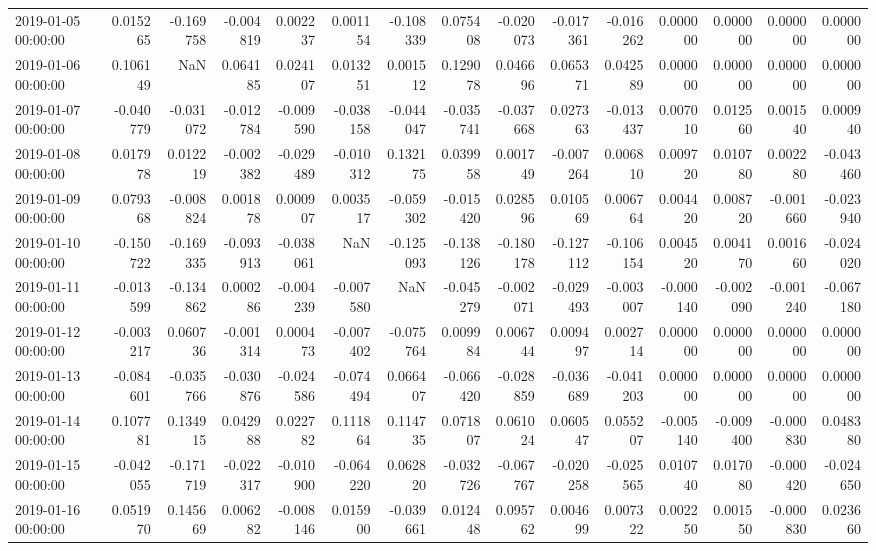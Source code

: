 \begin{tabular}{lrrrrrrrrrrrrrr}
2019-01-05 00:00:00 & 0.015265 & -0.169758 & -0.004819 & 0.002237 & 0.001154 & -0.108339 & 0.075408 & -0.020073 & -0.017361 & -0.016262 & 0.000000 & 0.000000 & 0.000000 & 0.000000 \\
2019-01-06 00:00:00 & 0.106149 & NaN & 0.064185 & 0.024107 & 0.013251 & 0.001512 & 0.129078 & 0.046696 & 0.065371 & 0.042589 & 0.000000 & 0.000000 & 0.000000 & 0.000000 \\
2019-01-07 00:00:00 & -0.040779 & -0.031072 & -0.012784 & -0.009590 & -0.038158 & -0.044047 & -0.035741 & -0.037668 & 0.027363 & -0.013437 & 0.007010 & 0.012560 & 0.001540 & 0.000940 \\
2019-01-08 00:00:00 & 0.017978 & 0.012219 & -0.002382 & -0.029489 & -0.010312 & 0.132175 & 0.039958 & 0.001749 & -0.007264 & 0.006810 & 0.009720 & 0.010780 & 0.002280 & -0.043460 \\
2019-01-09 00:00:00 & 0.079368 & -0.008824 & 0.001878 & 0.000907 & 0.003517 & -0.059302 & -0.015420 & 0.028596 & 0.010569 & 0.006764 & 0.004420 & 0.008720 & -0.001660 & -0.023940 \\
2019-01-10 00:00:00 & -0.150722 & -0.169335 & -0.093913 & -0.038061 & NaN & -0.125093 & -0.138126 & -0.180178 & -0.127112 & -0.106154 & 0.004520 & 0.004170 & 0.001660 & -0.024020 \\
2019-01-11 00:00:00 & -0.013599 & -0.134862 & 0.000286 & -0.004239 & -0.007580 & NaN & -0.045279 & -0.002071 & -0.029493 & -0.003007 & -0.000140 & -0.002090 & -0.001240 & -0.067180 \\
2019-01-12 00:00:00 & -0.003217 & 0.060736 & -0.001314 & 0.000473 & -0.007402 & -0.075764 & 0.009984 & 0.006744 & 0.009497 & 0.002714 & 0.000000 & 0.000000 & 0.000000 & 0.000000 \\
2019-01-13 00:00:00 & -0.084601 & -0.035766 & -0.030876 & -0.024586 & -0.074494 & 0.066407 & -0.066420 & -0.028859 & -0.036689 & -0.041203 & 0.000000 & 0.000000 & 0.000000 & 0.000000 \\
2019-01-14 00:00:00 & 0.107781 & 0.134915 & 0.042988 & 0.022782 & 0.111864 & 0.114735 & 0.071807 & 0.061024 & 0.060547 & 0.055207 & -0.005140 & -0.009400 & -0.000830 & 0.048380 \\
2019-01-15 00:00:00 & -0.042055 & -0.171719 & -0.022317 & -0.010900 & -0.064220 & 0.062820 & -0.032726 & -0.067767 & -0.020258 & -0.025565 & 0.010740 & 0.017080 & -0.000420 & -0.024650 \\
2019-01-16 00:00:00 & 0.051970 & 0.145669 & 0.006282 & -0.008146 & 0.015900 & -0.039661 & 0.012448 & 0.095762 & 0.004699 & 0.007322 & 0.002250 & 0.001550 & -0.000830 & 0.023660 \\

\end{tabular}
